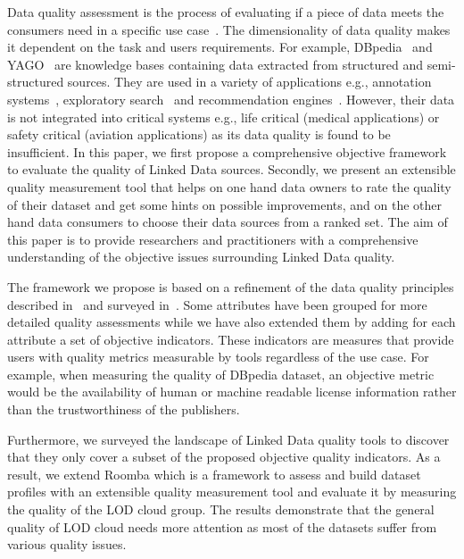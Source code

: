 \documentclass[onecolumn, crcready]{../../Tools/LaTEX/iosart2c}
\begin{document}
Data quality assessment is the process of evaluating if a piece of data meets the consumers need in a specific use case~\cite{Bizer:WebSemantics:09}. The dimensionality of data quality makes it dependent on the task and users requirements. For example, DBpedia~\cite{Bizer:WebSemJorunal:09} and YAGO~\cite{Suchanek::WWW:07} are knowledge bases containing data extracted from structured and semi-structured sources. They are used in a variety of applications  e.g., annotation systems~\cite{Mendes:ICS:11}, exploratory search~\cite{Marie:ICS:13} and recommendation engines~\cite{DiNoia:iSemantics:12}. However, their data is not integrated into critical systems e.g., life critical (medical applications) or safety critical (aviation applications) as its data quality is found to be insufficient. In this paper, we first propose a comprehensive objective framework to evaluate the quality of Linked Data sources. Secondly, we present an extensible quality measurement tool that helps on one hand data owners to rate the quality of their dataset and get some hints on possible improvements, and on the other hand data consumers to choose their data sources from a ranked set. The aim of this paper is to provide researchers and practitioners with a comprehensive understanding of the objective issues surrounding Linked Data quality.

The framework we propose is based on a refinement of the data quality principles described in~\cite{Assaf:DQMST:12} and surveyed in~\cite{Zaveri:SemWebJorunal:12}. Some attributes have been grouped for more detailed quality assessments while we have also extended them by adding for each attribute a set of objective indicators. These indicators are measures that provide users with quality metrics measurable by tools regardless of the use case. For example, when measuring the quality of DBpedia dataset, an objective metric would be the availability of human or machine readable license information rather than the trustworthiness of the publishers.

Furthermore, we surveyed the landscape of Linked Data quality tools to discover that they only cover a subset of the proposed objective quality indicators. As a result, we extend Roomba which is a framework to assess and build dataset profiles with an extensible quality measurement tool and evaluate it by measuring the quality of the LOD cloud group. The results demonstrate that the general quality of LOD cloud needs more attention as most of the datasets suffer from various quality issues.
\end{document}
